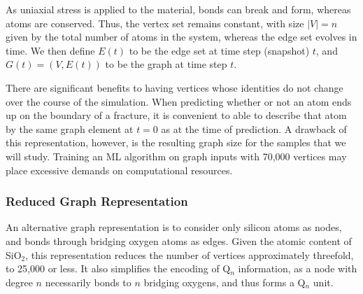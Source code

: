 As uniaxial stress is applied to the material, bonds can break and form, whereas atoms are conserved.  Thus, the vertex set remains constant, with size $|V|=n$ given by the total number of atoms in the system, whereas the edge set evolves in time.  We then define $E(t)$ to be the edge set at time step (snapshot) $t$, and $G(t) = (V,E(t))$ to be the graph at time step $t$.

There are significant benefits to having vertices whose identities do not change over the course of the simulation.  When predicting whether or not an atom ends up on the boundary of a fracture, it is convenient to able to describe that atom by the same graph element at $t=0$ as at the time of prediction.  A drawback of this representation, however, is the resulting graph size for the samples that we will study.  Training an ML algorithm on graph inputs with 70,000 vertices may place excessive demands on computational resources.


    
\subsubsection{Reduced Graph Representation} 

An alternative graph representation is to consider only silicon atoms as nodes, and bonds through bridging oxygen atoms as edges.  Given the atomic content of SiO$_2$, this representation reduces the number of vertices approximately threefold, to 25,000 or less.  It also simplifies the encoding of Q$_n$ information, as a node with degree $n$ necessarily bonds to $n$ bridging oxygens, and thus forms a Q$_n$ unit.

